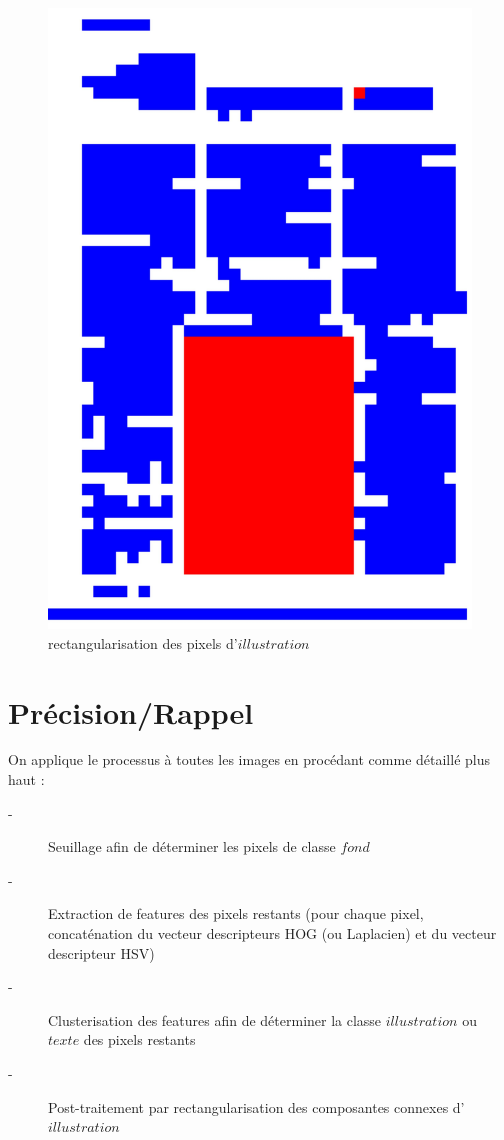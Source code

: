 \documentclass{book}
\begin{document}
\begin{figure}[H]
\begin{center}
\includegraphics[scale=0.06]{images/rect_50_res_hog_hsv_kmeans_2.jpg}
\end{center}
\caption{\og rectangularisation \fg{} des pixels d'$illustration$}
\label{rect4}
\end{figure}

\clearpage

\chapter{Précision/Rappel}

On applique le processus à toutes les images en procédant comme détaillé plus haut :

\begin{description}
 \item[-] Seuillage afin de déterminer les pixels de classe $fond$
 \item[-] Extraction de features des pixels restants (pour chaque pixel, concaténation du vecteur descripteurs HOG (ou Laplacien) et du vecteur descripteur HSV)
 \item[-] Clusterisation des features afin de déterminer la classe $illustration$ ou $texte$ des pixels restants
 \item[-] Post-traitement par \og rectangularisation \fg{} des composantes connexes d'$illustration$
\end{description}
\end{document}
